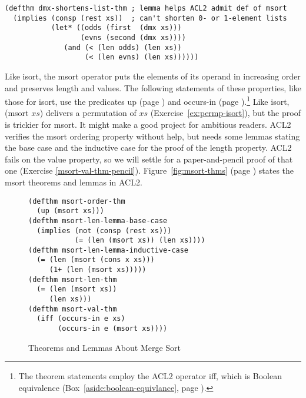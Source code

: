 \label{defthm:dmx-shortens-list}
\begin{code}
\begin{verbatim}
(defthm dmx-shortens-list-thm ; lemma helps ACL2 admit def of msort
  (implies (consp (rest xs))  ; can't shorten 0- or 1-element lists
           (let* ((odds (first  (dmx xs)))
                  (evns (second (dmx xs))))
              (and (< (len odds) (len xs))
                   (< (len evns) (len xs))))))
\end{verbatim}
\end{code}

Like \textsf{isort}, the \textsf{msort} operator puts the elements of its operand
in increasing order and preserves length and values.
The following statements of these properties, like those for \textsf{isort},
use the predicates \textsf{up} (page \pageref{defun:up})
and \textsf{occurs-in} (page \pageref{def:occurs-in}).\footnote{The
theorem statements employ the ACL2 operator \textsf{iff}, which is
Boolean equivalence
(Box~\ref{aside:boolean-equivlance}, page \pageref{aside:boolean-equivlance}).}
Like \textsf{isort}, \textsf{(msort $xs$)} delivers a permutation of $xs$
(Exercise~\ref{ex:permp-isort}), but the proof is trickier for \textsf{msort}.
It might make a good project for ambitious readers.
ACL2 verifies the \textsf{msort} ordering property without help,
but needs some lemmas stating the base case and the inductive case for
the proof of the length property.
ACL2 fails on the value property, so
we will settle for a paper-and-pencil proof of that one
(Exercise \ref{msort-val-thm-pencil}).
Figure~\ref{fig:msort-thms} (page \pageref{fig:msort-thms})
states the \textsf{msort} theorems and lemmas in ACL2.

\begin{figure}
\begin{code}
\begin{verbatim}
(defthm msort-order-thm
  (up (msort xs)))
(defthm msort-len-lemma-base-case
  (implies (not (consp (rest xs)))
           (= (len (msort xs)) (len xs))))
(defthm msort-len-lemma-inductive-case
  (= (len (msort (cons x xs)))
     (1+ (len (msort xs)))))
(defthm msort-len-thm
  (= (len (msort xs))
     (len xs)))
(defthm msort-val-thm
  (iff (occurs-in e xs)
       (occurs-in e (msort xs))))
\end{verbatim}
\end{code}
\label{defthm:msort-len}\label{defthm:msort-val}
\caption{Theorems and Lemmas About Merge Sort}
\label{fig:msort-thms}
\label{defthm:msort-ord}
\end{figure}

